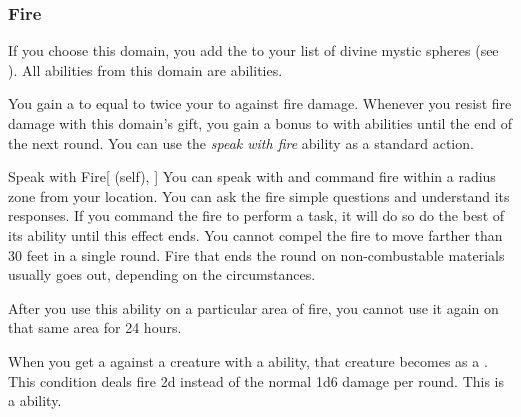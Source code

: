         \subsubsection{Fire}
            If you choose this domain, you add the   to your list of divine mystic spheres (see ).
            All abilities from this domain are  abilities.

             You gain a  to equal to twice your  to  against fire damage.
             Whenever you resist fire damage with this domain's gift, you gain a  bonus to  with  abilities until the end of the next round.
             You can use the \textit{speak with fire} ability as a standard action.
            \begin{attuneability}{Speak with Fire}[ (self), ]
                You can speak with and command fire within a \areahuge radius zone from your location.
                You can ask the fire simple questions and understand its responses.
                If you command the fire to perform a task, it will do so do the best of its ability until this effect ends.
                You cannot compel the fire to move farther than 30 feet in a single round.
                Fire that ends the round on non-combustable materials usually goes out, depending on the circumstances.

                After you use this ability on a particular area of fire, you cannot use it again on that same area for 24 hours.
            \end{attuneability}
             When you get a  against a creature with a  ability, that creature becomes \ignited as a .
            This condition deals fire  \minus2d instead of the normal 1d6 damage per round.
            This is a  ability.


